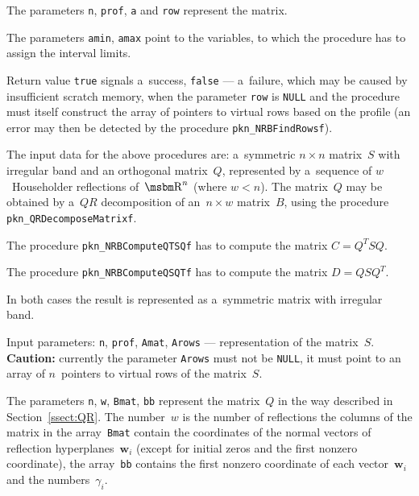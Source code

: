 The parameters \texttt{n}, \texttt{prof}, \texttt{a} and \texttt{row}
represent the matrix.

The parameters \texttt{amin}, \texttt{amax} point to the variables,
to which the procedure has to assign the interval limits.

Return value \texttt{true} signals a~success, \texttt{false} ---
a~failure, which may be caused by insufficient scratch memory, when
the parameter \texttt{row} is \texttt{NULL} and the procedure
must itself construct the array of pointers to virtual rows
based on the profile
(an error may then be detected by the procedure
\texttt{pkn\_NRBFindRowsf}).

\vspace{\bigskipamount}
The input data for the above procedures are:
a~symmetric $n\times n$ matrix~$S$ with irregular band and an
orthogonal matrix~$Q$, represented by a~sequence of $w$~Householder
reflections of~$\R^n$ (where $w<n$).
The matrix~$Q$ may be obtained by a~$QR$ decomposition of an~$n\times w$
matrix~$B$, using the procedure \texttt{pkn\_QRDecomposeMatrixf}.

The procedure \texttt{pkn\_NRBComputeQTSQf} has to compute the matrix
$C=Q^TSQ$.

The procedure \texttt{pkn\_NRBComputeQSQTf} has to compute the matrix
$D=QSQ^T$.

In both cases the result is represented as a~symmetric matrix with irregular
band.

Input parameters: \texttt{n}, \texttt{prof}, \texttt{Amat},
\texttt{Arows} --- representation of the matrix~$S$. \\
\textbf{Caution:} currently the parameter \texttt{Arows} must not be
\texttt{NULL}, it must point to an array of $n$~pointers to virtual
rows of the matrix~$S$.

The parameters \texttt{n}, \texttt{w}, \texttt{Bmat}, \texttt{bb} represent
the matrix~$Q$ in the way described in Section~\ref{ssect:QR}.
The number~$w$ is the number of reflections the columns of the matrix
in the array~\texttt{Bmat} contain the coordinates of the normal vectors
of reflection hyperplanes~$\bm{w}_i$
(except for initial zeros and the first nonzero coordinate),
the array~\texttt{bb} contains the first nonzero coordinate of each
vector~$\bm{w}_i$ and the numbers~$\gamma_i$.

